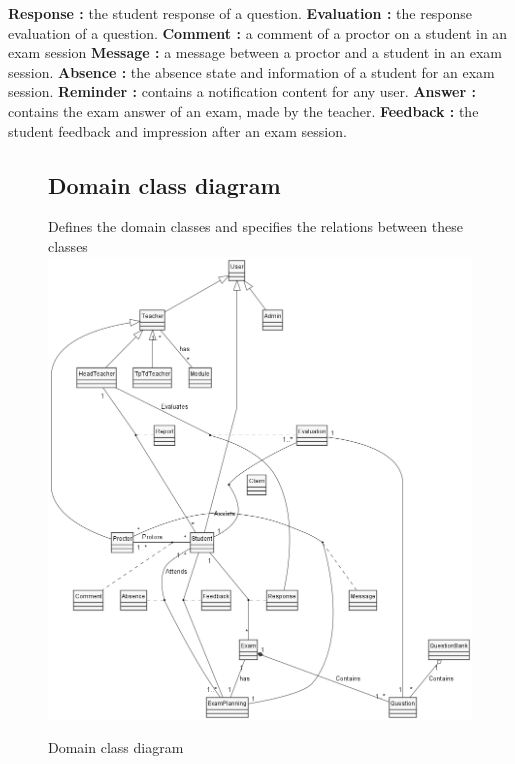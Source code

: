 \documentclass[]{uc2pfecaneva}
\begin{document}
    \textbf{Response :} the student response of a question.\linebreak
    \textbf{Evaluation :} the response evaluation of a question.\linebreak
    \textbf{Comment :} a comment of a proctor on a student in an exam session\linebreak
    \textbf{Message :} a message between a proctor and a student in an exam session.\linebreak
    \textbf{Absence :} the absence state and information of a student for an exam session.\linebreak
    \textbf{Reminder :} contains a notification content for any user.\linebreak
    \textbf{Answer :} contains the exam answer of an exam, made by the teacher.\linebreak
    \textbf{Feedback :} the student feedback and impression after an exam session.


    \begin{figure}
        \subsection{Domain class diagram}
        \raggedright Defines the domain classes and specifies the relations between these classes
        \linebreak
        \includegraphics[width=\textwidth]{images/DCD}
        \caption{Domain class diagram}
    \end{figure}
\end{document}
